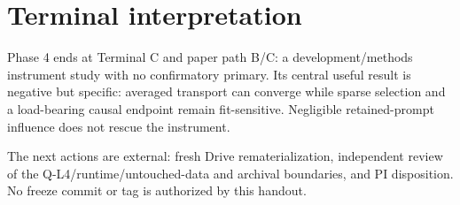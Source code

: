 \documentclass[10pt]{article}
\begin{document}
\section{Terminal interpretation}

\enlargethispage{1.5\baselineskip}

Phase 4 ends at Terminal C and paper path B/C: a development/methods instrument
study with no confirmatory primary. Its central useful result is negative but
specific: averaged transport can converge while sparse selection and a
load-bearing causal endpoint remain fit-sensitive. Negligible retained-prompt
influence does not rescue the instrument.

The next actions are external: fresh Drive rematerialization, independent
review of the Q-L4/runtime/untouched-data and archival boundaries, and PI
disposition. No freeze commit or tag is authorized by this handout.
\end{document}
